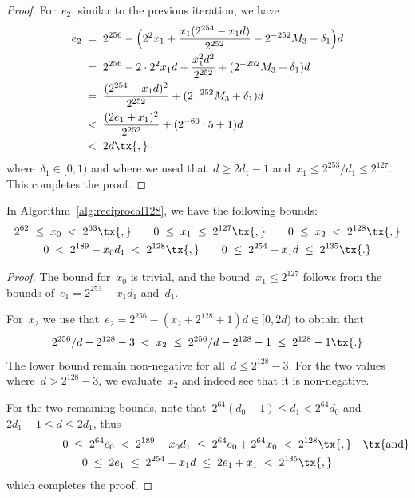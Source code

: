 \documentclass[12pt,oneside,draft]{scrartcl}
\begin{document}
\begin{proof}
For~$e_{2}$, similar to the previous iteration, we have
\begin{align*}
  e_{2}
\;={}&\;
  2^{256} - \Bigl( 2^{2} x_{1} + \frac{x_{1} (2^{254} - x_{1} d)}{2^{252}} - 2^{-252} M_{3} - \delta_{1} \Bigr) d
\\
={}&\;
  2^{256} - 2 \cdot 2^{2} x_{1} d + \frac{x_{1}^{2} d^{2}}{2^{252}} + (2^{-252} M_{3} + \delta_{1}) d
\\
={}&\;
  \frac{(2^{254} - x_{1} d)^{2}}{2^{252}} + (2^{-252} M_{3} + \delta_{1}) d
\\
<{}&\;
\frac{(2 e_{1} + x_{1})^{2}}{2^{252}} + (2^{-60} \cdot 5 + 1) d
\\
<{}&\;
  2 d
\tx{,}
\end{align*}
where~$\delta_{1} \in [0, 1)$ and where we used that~$d \ge 2 d_{1} - 1$ and~$x_{1} \le 2^{253} / d_{1} \le 2^{127}$.  This completes the proof.
\end{proof}

\begin{corollary}
\label{corr:variable128_bounds}
In Algorithm~\ref{alg:reciprocal128}, we have the following bounds:
\begin{gather*}
  2^{62}
\;\le\;
  x_{0}
\;<\;
  2^{63}
\tx{,}\qquad
  0
\;\le\;
  x_{1}
\;\le\;
  2^{127}
\tx{,}\qquad
  0
\;\le\;
  x_{2}
\;<\;
  2^{128}
\tx{,}
\\
  0
\;<\;
  2^{189} - x_{0} d_{1}
\;<\;
  2^{128}
\tx{,}\qquad
  0
\;\le\;
  2^{254} - x_{1} d
\;\le\;
  2^{135}
\tx{.}
\end{gather*}
\end{corollary}
\begin{proof}
The bound for~$x_{0}$ is trivial, and the bound~$x_{1} \le 2^{127}$ follows from the bounds of~$e_{1} = 2^{253} - x_{1} d_{1}$ and~$d_{1}$.

For~$x_{2}$ we use that~$e_{2} = 2^{256} - (x_{2} + 2^{128} + 1) d \in [0, 2 d)$ to obtain that
\begin{gather*}
  2^{256} / d - 2^{128} - 3
\;<\;
  x_{2}
\;\le\;
  2^{256} / d - 2^{128} - 1
\;\le\;
  2^{128} - 1
\tx{.}
\end{gather*}
The lower bound remain non-negative for all~$d \le 2^{128} - 3$.  For the two values where~$d > 2^{128} - 3$, we evaluate~$x_{2}$ and indeed see that it is non-negative.

For the two remaining bounds, note that~$2^{64} (d_{0} - 1) \le d_{1} < 2^{64} d_{0}$ and~$2 d_{1} - 1 \le d \le 2 d_{1}$, thus
\begin{gather*}
  0
\;\le\;
  2^{64} e_{0}
\;<\;
  2^{189} - x_{0} d_{1}
\;\le\;
  2^{64} e_{0} + 2^{64} x_{0}
\;<\;
  2^{128}
\tx{,}\makebox[0pt][l]{\quad\tx{and}}
\\
  0
\;\le\;
  2 e_{1}
\;\le\;
  2^{254} - x_{1} d
\;\le\;
  2 e_{1} + x_{1}
\;<\;
  2^{135}
\tx{,}
\end{gather*}
which completes the proof.
\end{proof}
\end{document}
